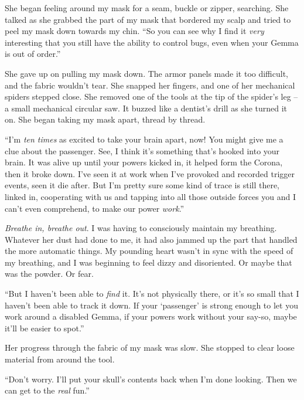 She began feeling around my mask for a seam, buckle or zipper, searching.  She talked as she grabbed the part of my mask that bordered my scalp and tried to peel my mask down towards my chin.  ``So you can see why I find it \emph{very} interesting that you still have the ability to control bugs, even when your Gemma is out of order.''



She gave up on pulling my mask down.  The armor panels made it too difficult, and the fabric wouldn't tear.  She snapped her fingers, and one of her mechanical spiders stepped close.  She removed one of the tools at the tip of the spider's leg – a small mechanical circular saw.  It buzzed like a dentist's drill as she turned it on.  She began taking my mask apart, thread by thread.



``I'm \emph{ten times} as excited to take your brain apart, now!  You might give me a clue about the passenger.  See, I think it's something that's hooked into your brain.  It was alive up until your powers kicked in, it helped form the Corona, then it broke down.  I've seen it at work when I've provoked and recorded trigger events, seen it die after.  But I'm pretty sure some kind of trace is still there, linked in, cooperating with us and tapping into all those outside forces you and I can't even comprehend, to make our power \emph{work}.''



\emph{Breathe in, breathe out}.  I was having to consciously maintain my breathing.  Whatever her dust had done to me, it had also jammed up the part that handled the more automatic things.  My pounding heart wasn't in sync with the speed of my breathing, and I was beginning to feel dizzy and disoriented.  Or maybe that was the powder.  Or fear.



``But I haven't been able to \emph{find} it.  It's not physically there, or it's so small that I haven't been able to track it down.  If your `passenger' is strong enough to let you work around a disabled Gemma, if your powers work without your say-so, maybe it'll be easier to spot.''



Her progress through the fabric of my mask was slow.  She stopped to clear loose material from around the tool.



``Don't worry.  I'll put your skull's contents back when I'm done looking.  Then we can get to the \emph{real} fun.''



